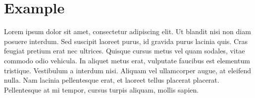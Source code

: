 
\chapter{Example}

Lorem ipsum dolor sit amet, consectetur adipiscing elit. Ut blandit nisi non diam posuere interdum. Sed suscipit laoreet purus, id gravida purus lacinia quis. Cras feugiat pretium erat nec ultrices. Quisque cursus metus vel quam sodales, vitae commodo odio vehicula. In aliquet metus erat, vulputate faucibus est elementum tristique. Vestibulum a interdum nisi. Aliquam vel ullamcorper augue, at eleifend nulla. Nam lacinia pellentesque erat, et laoreet tellus placerat placerat. Pellentesque at mi tempor, cursus turpis aliquam, mollis sapien.

